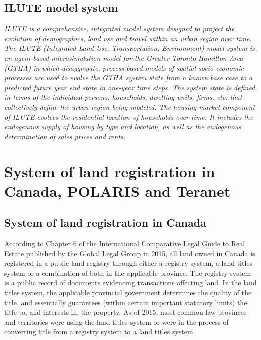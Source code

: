 \subsection{ILUTE model system} \label{subsec:ilute}

\textit{ILUTE is a comprehensive, integrated model system designed to project the evolution of demographics, land use and travel within an urban region over time.
The ILUTE (Integrated Land Use, Transportation, Environment) model system is an agent-based microsimulation model for the Greater Toronto-Hamilton Area (GTHA) in which disaggregate, process-based models of spatial socio-economic processes are used to evolve the GTHA system state from a known base case to a predicted future year end state in one-year time steps.
The system state is defined in terms of the individual persons, households, dwelling units, firms, etc.
that collectively define the urban region being modeled.
The housing market component of ILUTE evolves the residential location of households over time.
It includes the endogenous supply of housing by type and location, as well as the endogenous determination of sales prices and rents.}\cite{Miller2010}


\section{System of land registration in Canada, POLARIS and Teranet} \label{sec:system_of_land_registration_polaris_teranet}

\subsection{System of land registration in Canada} \label{subsec:land_reg_system_canada}

According to Chapter 6 of the International Comparative Legal Guide to Real Estate published by the Global Legal Group in 2015\cite{McKean2015}, all land owned in Canada is registered in a public land registry through either a registry system, a land titles system or a combination of both in the applicable province.
The registry system is a public record of documents evidencing transactions affecting land.
In the land titles system, the applicable provincial government determines the quality of the title, and essentially guarantees (within certain important statutory limits) the title to, and interests in, the property.
As of 2015, most common law provinces and territories were using the land titles system or were in the process of converting title from a registry system to a land titles system.


